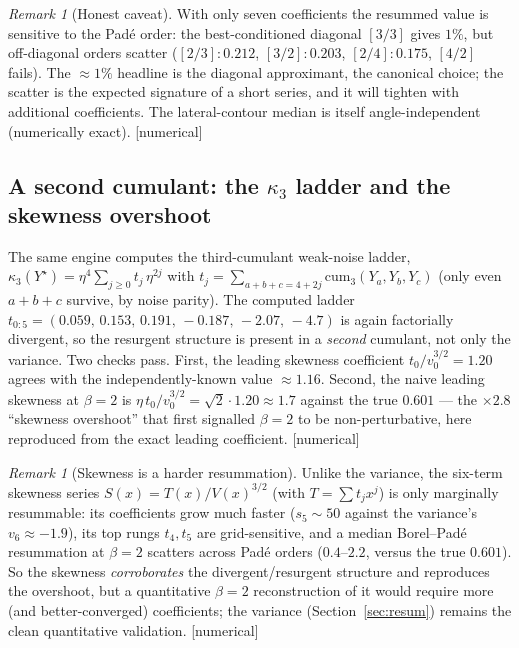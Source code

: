 \documentclass[11pt,reqno]{amsart}
\theoremstyle{plain}
\theoremstyle{definition}
\theoremstyle{remark}
\newtheorem{remark}[theorem]{Remark}
\newcommand{\tagN}{{\footnotesize\textsf{[numerical]}}}
\begin{document}
\begin{remark}[Honest caveat]\label{rem:resumcaveat}
With only seven coefficients the resummed value is sensitive to the Pad\'e order: the
best-conditioned diagonal $[3/3]$ gives $1\%$, but off-diagonal orders scatter
($[2/3]\!:0.212$, $[3/2]\!:0.203$, $[2/4]\!:0.175$, $[4/2]$ fails). The $\approx1\%$ headline is
the diagonal approximant, the canonical choice; the scatter is the expected signature of a short
series, and it will tighten with additional coefficients. The lateral-contour median is itself
angle-independent (numerically exact). \tagN
\end{remark}

\subsection{A second cumulant: the $\kappa_3$ ladder and the skewness overshoot}
\label{sec:kappa3}
The same engine computes the third-cumulant weak-noise ladder,
$\kappa_3(Y^\star)=\eta^4\sum_{j\ge0}t_j\,\eta^{2j}$ with
$t_j=\sum_{a+b+c=4+2j}\mathrm{cum}_3(Y_a,Y_b,Y_c)$ (only even $a+b+c$ survive, by
noise parity). The computed ladder $t_{0:5}=(0.059,\,0.153,\,0.191,\,-0.187,\,-2.07,\,-4.7)$
is again factorially divergent, so the resurgent structure is present in a \emph{second}
cumulant, not only the variance. Two checks pass. First, the leading skewness coefficient
$t_0/v_0^{3/2}=1.20$ agrees with the independently-known value $\approx1.16$. Second, the
naive leading skewness at $\beta=2$ is $\eta\,t_0/v_0^{3/2}=\sqrt2\cdot1.20\approx1.7$ against
the true $0.601$ --- the $\times2.8$ ``skewness overshoot'' that first signalled $\beta=2$ to be
non-perturbative, here reproduced from the exact leading coefficient. \tagN

\begin{remark}[Skewness is a harder resummation]\label{rem:skewhard}
Unlike the variance, the six-term skewness series $S(x)=T(x)/V(x)^{3/2}$ (with
$T=\sum t_j x^j$) is only marginally resummable: its coefficients grow much faster
($s_5\sim50$ against the variance's $v_6\approx-1.9$), its top rungs $t_4,t_5$ are
grid-sensitive, and a median Borel--Pad\'e resummation at $\beta=2$ scatters across Pad\'e
orders ($0.4$--$2.2$, versus the true $0.601$). So the skewness \emph{corroborates} the
divergent/resurgent structure and reproduces the overshoot, but a quantitative $\beta=2$
reconstruction of it would require more (and better-converged) coefficients; the variance
(Section~\ref{sec:resum}) remains the clean quantitative validation. \tagN
\end{remark}
\end{document}
